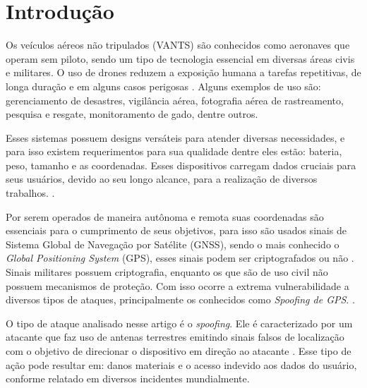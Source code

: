 \documentclass[12pt]{article}
\begin{document}
\section{Introdução}

Os veículos aéreos não tripulados (VANTS) são conhecidos como aeronaves que operam sem piloto,
sendo um tipo de tecnologia essencial em diversas áreas civis e militares.
O uso de drones reduzem a exposição humana a tarefas repetitivas, de longa duração e em alguns casos perigosas \cite{dialogos}.
Alguns exemplos de uso são: gerenciamento de desastres, vigilância aérea, fotografia aérea de rastreamento, pesquisa e resgate,
monitoramento de gado, dentre outros. \cite{titounaLightweightSecurityTechnique2021} 

Esses sistemas possuem designs versáteis para atender diversas necessidades,
e para isso existem requerimentos para sua qualidade dentre eles estão: bateria, peso, tamanho e as coordenadas.
Esses dispositivos carregam dados cruciais para seus usuários, devido ao seu longo alcance,
para a realização de diversos trabalhos. \cite{khan}. 

Por serem operados de maneira autônoma e remota suas coordenadas são essenciais
para o cumprimento de seus objetivos, para isso são usados sinais de Sistema Global de Navegação por Satélite (GNSS),
sendo o mais conhecido o \textit{Global Positioning System} (GPS), esses sinais podem ser criptografados ou não
\cite {lester}. Sinais militares possuem criptografia, enquanto os que são de uso civil não possuem mecanismos de proteção.
Com isso ocorre a extrema vulnerabilidade a diversos tipos de ataques, principalmente os conhecidos como \textit{Spoofing de GPS}.
\cite{srinivasansGPSSpoofingDetection2023}.

O tipo de ataque analisado nesse artigo é o \textit{spoofing}. 
Ele é caracterizado por um atacante que faz uso de antenas terrestres emitindo sinais falsos
de localização com o objetivo de direcionar o dispositivo em direção ao atacante \cite {Spoofing}.
Esse tipo de ação pode resultar em: danos materiais e o acesso indevido aos dados do usuário,
conforme relatado em diversos incidentes mundialmente.
\cite{g1drone2022a,g1drone2022b,bandnews2022,bemparana2022,veja2022,forbes2020,australianaviation2022}
\end{document}
